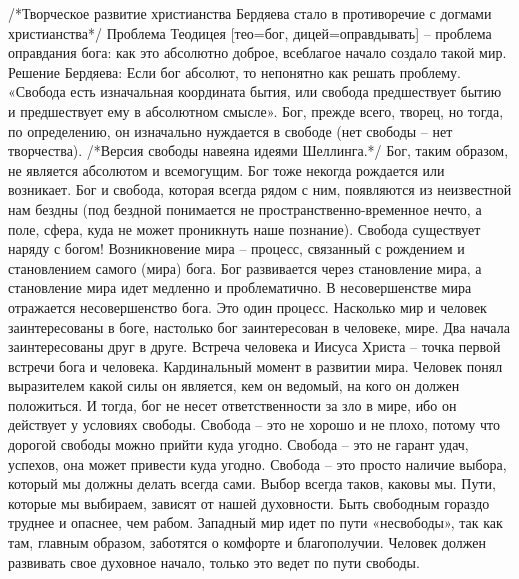 \documentclass[12pt]{article}
\begin{document}
/*Творческое развитие христианства Бердяева стало в противоречие с догмами христианства*/
Проблема Теодицея [тео=бог, дицей=оправдывать] – проблема оправдания бога: как это абсолютно доброе,
всеблагое начало создало такой мир.
Решение  Бердяева:  Если  бог  абсолют,  то  непонятно  как  решать  проблему.  «Свобода  есть  изначальная
координата бытия, или свобода предшествует бытию и предшествует ему в абсолютном смысле». Бог, прежде
всего, творец, но тогда, по определению, он изначально нуждается в свободе (нет свободы – нет творчества).
/*Версия свободы навеяна идеями Шеллинга.*/ Бог, таким образом, не является абсолютом и всемогущим. Бог
тоже некогда рождается или возникает. Бог и свобода, которая всегда рядом с ним, появляются из неизвестной
нам  бездны  (под  бездной  понимается  не  пространственно-временное  нечто,  а  поле,  сфера,  куда  не  может
проникнуть наше познание).
Свобода существует наряду с богом!
Возникновение мира – процесс, связанный с рождением и становлением самого (мира) бога. Бог развивается
через  становление  мира,  а  становление  мира  идет  медленно  и  проблематично.  В  несовершенстве  мира
отражается несовершенство бога. Это один процесс. Насколько мир и человек заинтересованы в боге, настолько
бог заинтересован в человеке, мире. Два начала заинтересованы друг в друге.
Встреча человека и Иисуса Христа – точка первой встречи бога и человека. Кардинальный момент в развитии
мира. Человек понял выразителем какой силы он является, кем он ведомый, на кого он должен положиться. И
тогда, бог не несет ответственности за зло в мире, ибо он действует у условиях свободы. 
Свобода – это не хорошо и не плохо, потому что дорогой свободы можно прийти куда угодно. Свобода – это не
гарант удач, успехов, она может привести куда угодно. Свобода – это просто наличие выбора, который мы
должны делать всегда сами. Выбор всегда таков, каковы мы. Пути, которые мы выбираем, зависят от нашей
духовности. 
Быть свободным гораздо труднее и опаснее, чем рабом. Западный мир идет по пути «несвободы», так как там,
главным образом, заботятся о комфорте и благополучии. Человек должен развивать свое духовное начало,
только это ведет по пути свободы.


\newpage
\end{document}

